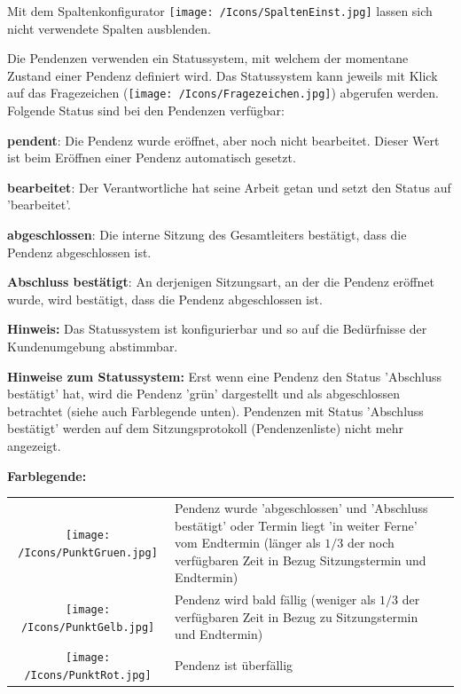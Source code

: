 Mit dem Spaltenkonfigurator \texttt{[image: /Icons/SpaltenEinst.jpg]}  lassen sich nicht verwendete Spalten ausblenden.

\vspace{\baselineskip}

Die Pendenzen verwenden ein Statussystem, mit welchem der momentane Zustand einer Pendenz definiert wird. Das Statussystem kann jeweils mit Klick auf das Fragezeichen (\texttt{[image: /Icons/Fragezeichen.jpg]})  abgerufen werden. Folgende Status sind bei den Pendenzen verfügbar:

\clearpage

\begin{compactitem}
	\item \textbf{pendent}: Die Pendenz wurde eröffnet, aber noch nicht bearbeitet. Dieser Wert ist beim Eröffnen einer Pendenz automatisch gesetzt.
	\item \textbf{bearbeitet}: Der Verantwortliche hat seine Arbeit getan und setzt den Status auf 'bearbeitet'.
	\item \textbf{abgeschlossen}: Die interne Sitzung des Gesamtleiters bestätigt, dass die Pendenz abgeschlossen ist.
	\item \textbf{Abschluss bestätigt}: An derjenigen Sitzungsart, an der die Pendenz eröffnet wurde, wird bestätigt, dass die Pendenz
abgeschlossen ist.
\end{compactitem}

\vspace{\baselineskip}

\textbf{Hinweis:} Das Statussystem ist konfigurierbar und so auf die Bedürfnisse der Kundenumgebung abstimmbar.

\vspace{\baselineskip}

\textbf{Hinweise zum Statussystem:} Erst wenn eine Pendenz den Status 'Abschluss bestätigt' hat, wird die Pendenz 'grün' dargestellt und als abgeschlossen betrachtet (siehe auch Farblegende unten). Pendenzen mit Status 'Abschluss bestätigt' werden auf dem Sitzungsprotokoll (Pendenzenliste) nicht mehr angezeigt.

\vspace{\baselineskip}

\textbf{Farblegende:}

\begin{tabular}{c p{14cm} l} %
\texttt{[image: /Icons/PunktGruen.jpg]} & Pendenz wurde 'abgeschlossen' und 'Abschluss bestätigt' oder Termin liegt 'in weiter Ferne' vom Endtermin (länger als \(1/3\) der noch verfügbaren Zeit in Bezug Sitzungstermin und Endtermin)\\
\texttt{[image: /Icons/PunktGelb.jpg]} & Pendenz wird bald fällig (weniger als \(1/3\) der verfügbaren Zeit in Bezug zu Sitzungstermin und Endtermin)\\
\texttt{[image: /Icons/PunktRot.jpg]} & Pendenz ist überfällig \\
\end{tabular}

